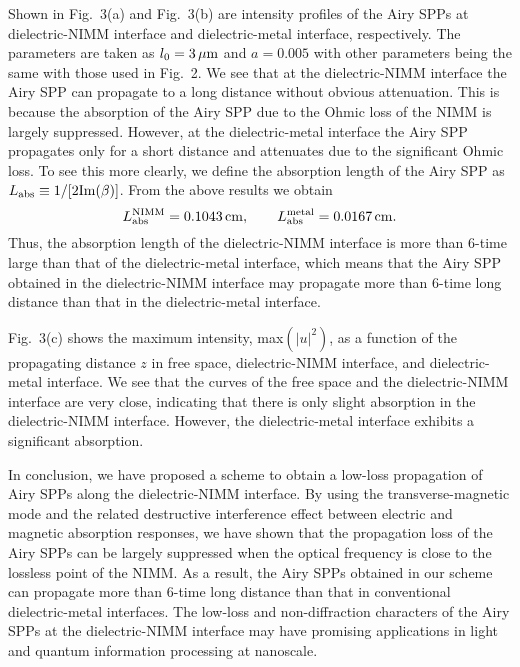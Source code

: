 \documentclass[aps,pra,preprint,groupedaddress,amsmath,amssymb,showpacs]{revtex4-1}
\begin{document}
\vskip 0.75cm

Shown in Fig.~3(a) and Fig.~3(b) are intensity profiles of the Airy SPPs at dielectric-NIMM interface and dielectric-metal interface, respectively. The parameters are taken as $l_0=3\,{\rm \mu m}$ and $a=0.005$ with other parameters being the same with those used in Fig.~2. We see that at the dielectric-NIMM interface the Airy SPP can propagate to a long distance without obvious attenuation. This is because the absorption of the Airy SPP due to the Ohmic loss of the NIMM is largely suppressed. However, at the dielectric-metal interface the Airy SPP propagates only for a short distance and attenuates due to the significant Ohmic loss. To see this more clearly, we define the absorption length of the Airy SPP as $L_{\rm abs}\equiv1/[2{\rm Im}(\beta)]$. From the above results we obtain
\begin{equation}
L_{\rm abs}^{\rm NIMM}=0.1043\, {\rm cm}, \qquad L_{\rm abs}^{\rm metal}=0.0167\, {\rm cm}.
\end{equation}
Thus, the absorption length of the dielectric-NIMM interface is more than 6-time large than that of the dielectric-metal interface, which means that the Airy SPP obtained in the dielectric-NIMM interface may propagate more than 6-time long distance than that in the dielectric-metal interface.

\vskip 0.75cm

Fig.~3(c) shows the maximum intensity, max$(|u|^2)$, as a function of the propagating distance $z$ in free space, dielectric-NIMM interface, and dielectric-metal interface. We see that the curves of the free space and the dielectric-NIMM interface are very close, indicating that there is only slight absorption in the dielectric-NIMM interface. However, the dielectric-metal interface exhibits a significant absorption.


\vskip 0.75cm

In conclusion, we have proposed a scheme to obtain a low-loss propagation of Airy SPPs along the dielectric-NIMM interface. By using the transverse-magnetic mode and the related destructive interference effect between electric and magnetic absorption responses, we have shown that the propagation loss of the Airy SPPs can be largely suppressed when the optical frequency is close to the lossless point of the NIMM. As a result, the Airy SPPs obtained in our scheme can propagate more than 6-time long distance than that in conventional dielectric-metal interfaces.
The low-loss and non-diffraction characters of the Airy SPPs at the dielectric-NIMM interface may have promising applications in light and quantum information processing at nanoscale.
%
\end{document}
